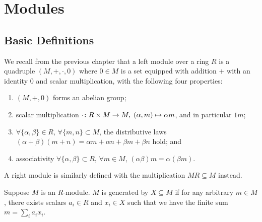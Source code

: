 \chapter{Modules}\label{sec:modules}

\section{Basic Definitions}

\begin{definition}
    We recall from the previous chapter that
    a left module over a ring \(R\) is a quadruple \((M,+,\cdot,0)\)
    where \(0 \in M\) is a set equipped with addition \(+\)
    with an identity \(0\)
    and scalar multiplication,
    with the following four properties:
    \begin{enumerate}[label={(\roman*)}, itemsep=0mm]
        \item \((M,+,0)\) forms an abelian group;
        \item scalar multiplication
            \(\cdot\colon R \times M\to M,\;(\alpha,m)\mapsto\alpha m\),
            and in particular \(1m\);
        \item \(\forall\{\alpha,\beta\} \in R,\, \forall\{m,n\} \subset M\),
            the distributive laws \((\alpha+\beta)(m+n)
            = \alpha m+\alpha n+\beta m+\beta n\) hold; and
        \item associativity
            \(\forall\{\alpha,\beta\} \subset R,\,\forall m \in M\),
            \((\alpha\beta)m = \alpha(\beta m)\).
    \end{enumerate}
    A right module is similarly defined with the multiplication \(MR \subseteq M\) instead.
\end{definition}

\begin{definition}
    Suppose \(M\) is an \(R\)-module.
    \(M\) is generated by \(X \subseteq M\)
    if for any arbitrary \(m \in M\),
    there exists scalars \(a_i \in R\) and \(x_i \in X\) such that
    we have the finite sum \(m = \sum_i a_i x_i\).
\end{definition}

